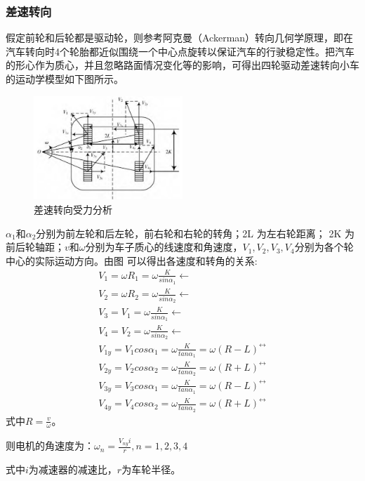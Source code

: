 \documentclass{report}
\begin{document}
\subsubsection{差速转向\cite{chasu}}
\label{subsec:label}
假定前轮和后轮都是驱动轮，则参考阿克曼（Ackerman）转向几何学原理，即在汽车转向时4个轮胎都近似围绕一个中心点旋转以保证汽车的行驶稳定性。把汽车的形心作为质心，并且忽略路面情况变化等的影响，可得出四轮驱动差速转向小车的运动学模型如下图所示。
\begin{figure}[ht]
  \centering
  \includegraphics[width=0.5\textwidth]{figures/chasu.png}
  \caption{差速转向受力分析}
\end{figure}
$\alpha_1$和$\alpha_2$分别为前左轮和后左轮，前右轮和右轮的转角；2L 为左右轮距离； 2K 为前后轮轴距；$v$和$\omega$分别为车子质心的线速度和角速度，$V_1,V_2,V_3,V_4$分别为各个轮中心的实际运动方向。由图 可以得出各速度和转角的关系:
\[\begin{gathered}
V_{1}=\omega R_{1}=\omega\frac{K}{sin\alpha_{1}}\leftarrow \\
V_{2}=\omega R_{2}=\omega\frac{K}{sin\alpha_{2}}\leftarrow \\
V_{3}=V_{1}=\omega\frac{K}{sin\alpha_{1}}\leftarrow \\
V_{4}=V_{2}=\omega\frac{K}{sin\alpha_{2}}\leftarrow \\
V_{1y}=V_{1}cos\alpha_{1}= \omega\frac{K}{tan\alpha_{1}}=\omega(R-L)^{\leftrightarrow}\\
V_{2y}=V_{2}cos\alpha_{2}= \omega\frac{K}{tan\alpha_{2}}=\omega(R+L)^{\leftrightarrow}\\
V_{3y}=V_{3}cos\alpha_{1}= \omega\frac{K}{tan\alpha_{1}}=\omega(R-L)^{\leftrightarrow}\\
V_{4y}=V_{4}cos\alpha_{2}= \omega\frac{K}{tan\alpha_{2}}=\omega(R+L)^{\leftrightarrow}
\end{gathered}\]
式中$R=\frac v\omega $。

则电机的角速度为：$\omega_n=\frac{V_{ny}i}r,n=1,2,3,4$

式中$i$为减速器的减速比，$r$为车轮半径。
\end{document}
